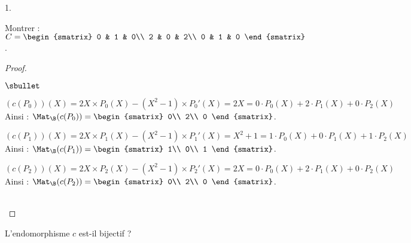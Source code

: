 \documentclass[11pt]{article}%
\begin{document}
\begin{noliste}{1.}
\setlength{\itemsep}{2mm}
\setcounter{enumi}{5}
\item Montrer : $C=\begin{smatrix}
0 & 1 & 0\\ 
2 & 0 & 2\\ 
0 & 1 & 0
\end{smatrix}$.

\begin{proof}~
\begin{noliste}{$\sbullet$}
\item $(c(P_0))(X)=2X\times P_0(X)-(X^2-1)\times P_0'(X)=2X=0\cdot 
P_0(X)+2\cdot P_1(X)+0\cdot P_2(X)$\\[.2cm]
Ainsi : $\Mat_{\B}(c(P_0)) =
	\begin{smatrix}
	 0\\
	 2\\
	 0
	\end{smatrix}$.

\item $(c(P_1))(X)=2X\times P_1(X) - (X^2-1)\times P_1'(X) 
=X^2+1=1\cdot P_0(X)+0\cdot 
P_1(X)+1\cdot P_2(X)$\\[.2cm]
Ainsi : $\Mat_{\B}(c(P_1)) =
	\begin{smatrix}
	 1\\
	 0\\
	 1
	\end{smatrix}$.
	
\item $(c(P_2))(X)=2X\times P_2(X) - (X^2-1)\times P_2'(X)=2X=0\cdot 
P_0(X)+2\cdot P_1(X)+0\cdot P_2(X)$\\[.2cm]
Ainsi : $\Mat_{\B}(c(P_2)) =
	\begin{smatrix}
	 0\\
	 2\\
	 0
	\end{smatrix}$.
\end{noliste}

~\\[-1cm]
\end{proof}

\item L'endomorphisme $c$ est-il bijectif ?


\end{noliste}
\end{document}
